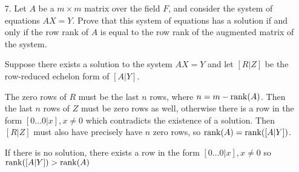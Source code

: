 \documentclass{article}
\begin{document}
\begin{enumerate}[listparindent=\parindent]
\item[7.] Let \(A\) be a \(m \times m\) matrix over the field \(F\), and consider the system of equations \(AX = Y\).
    Prove that this system of equations has a solution if and only if the row rank of \(A\) is equal to the row rank
    of the augmented matrix of the system.
    
    Suppose there exists a solution to the system \(AX = Y\) and let \([R | Z]\) be the row-reduced echelon form of \([A | Y]\).

    The zero rows of \(R\) must be the last \(n\) rows, where \(n = m - \operatorname{rank}(A)\).
    Then the last \(n\) rows of \(Z\) must be zero rows as well,
    otherwise there is a row in the form \([0 \dots 0 | x], x \neq 0\) which contradicts the existence of a solution.
    Then \([R | Z]\) must also have precisely have \(n\) zero rows, so \(\operatorname{rank}(A) = \operatorname{rank}([A | Y])\).

    If there is no solution, there exists a row in the form \([0 \dots 0 | x], x \neq 0\) so \(\operatorname{rank}([A | Y]) > \operatorname{rank}(A)\)

\end{enumerate}
\end{document}
